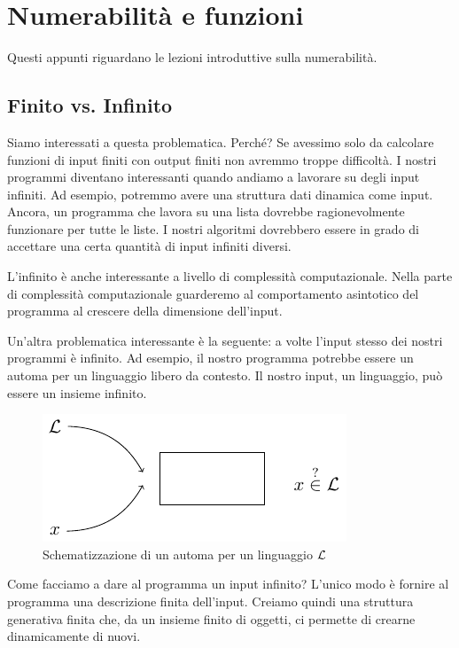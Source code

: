 \chapter{Numerabilità e funzioni}

Questi appunti riguardano le lezioni introduttive sulla numerabilità.


\section{Finito vs. Infinito}

Siamo interessati a questa problematica. Perché? Se avessimo solo da calcolare funzioni di input
finiti con output finiti non avremmo troppe difficoltà. I nostri programmi diventano interessanti
quando andiamo a lavorare su degli input infiniti. Ad esempio, potremmo avere una struttura dati
dinamica come input. Ancora, un programma che lavora su una lista dovrebbe ragionevolmente
funzionare per tutte le liste. I nostri algoritmi dovrebbero essere in grado di accettare una
certa quantità di input infiniti diversi.

L'infinito è anche interessante a livello di complessità computazionale. Nella parte di
complessità computazionale guarderemo al comportamento asintotico del programma al crescere della
dimensione dell'input.

Un'altra problematica interessante è la seguente: a volte l'input stesso dei nostri programmi è
infinito.  Ad esempio, il nostro programma potrebbe essere un automa per un linguaggio libero da
contesto. Il nostro input, un linguaggio, può essere un insieme infinito. 

\begin{figure}[h]
    \centering
    \includegraphics{img/LanguageExample.pdf}
    \caption{Schematizzazione di un automa per un linguaggio $\mathcal{L}$}
\end{figure}

Come facciamo a dare al programma un input infinito? L'unico modo è fornire al programma una
descrizione finita dell'input. Creiamo quindi una struttura generativa finita che, da un insieme
finito di oggetti, ci permette di crearne dinamicamente di nuovi.

